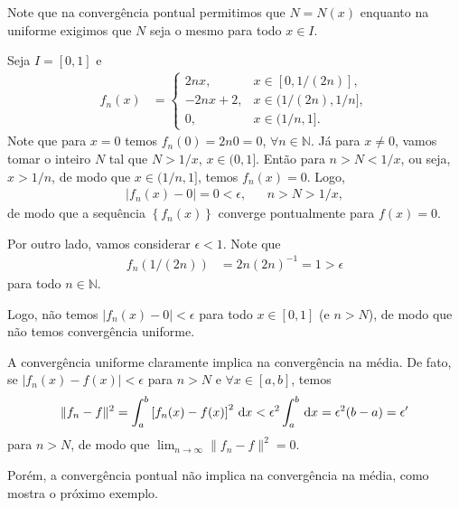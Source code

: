 \begin{obs}
    Note que na converg\^{e}ncia pontual permitimos que $N = N(x)$ enquanto na uniforme exigimos que $N$ seja o mesmo para todo $x \in I$.
\end{obs}

\begin{exem}
    Seja $I = [0, 1]$ e
    \begin{align*}
        f_n(x) &= \begin{cases}
            2 n x, & x \in [0, 1 / (2n)], \\
            -2 n x + 2, & x \in (1 / (2n), 1 / n], \\
            0, & x \in (1 / n, 1].
        \end{cases}
    \end{align*}
    Note que para $x = 0$ temos $f_n(0) = 2 n 0 = 0$, $\forall n \in \mathbb{N}$. J\'{a} para $x \neq 0$, vamos tomar o inteiro $N$ tal que $N > 1 / x$, $x \in (0, 1]$. Ent\~{a}o para $n > N < 1 / x$, ou seja, $x > 1 / n$, de modo que $x \in (1/n, 1]$, temos $f_n(x) = 0$. Logo,
    \begin{align*}
        | f_n(x) - 0 | = 0 < \epsilon, && n > N > 1/x,
    \end{align*}
    de modo que a sequ\^{e}ncia $\left\{ f_n(x) \right\}$ converge pontualmente para $f(x) = 0$.

    Por outro lado, vamos considerar $\epsilon < 1$. Note que
    \begin{align*}
        f_n\left( 1/\left( 2n \right) \right) &= 2 n \left( 2 n \right)^{-1} = 1 > \epsilon
    \end{align*}
    para todo $n \in \mathbb{N}$.

    Logo, n\~{a}o temos $| f_n(x) - 0 | < \epsilon$ para todo $x \in [0,1]$ (e $n > N$), de modo que n\~{a}o temos converg\^{e}ncia uniforme.
\end{exem}

A converg\^{e}ncia uniforme claramente implica na converg\^{e}ncia na m\'{e}dia. De fato, se $| f_n(x) - f(x) | < \epsilon$ para $n > N$ e $\forall x \in [a,b]$, temos
\begin{align*}
    \| f_n - f \|^2 = \int_a^b \left[ f_n(x) - f(x) \right]^2 \, \mathrm{d}x < \epsilon^2 \int_a^b \, \mathrm{d}x = \epsilon^2 (b - a) = \epsilon'
\end{align*}
para $n > N$, de modo que $\lim_{n \to \infty} \| f_n - f \|^2 = 0$.

Por\'{e}m, a converg\^{e}ncia pontual n\~{a}o implica na converg\^{e}ncia na m\'{e}dia, como mostra o pr\'{o}ximo exemplo.

